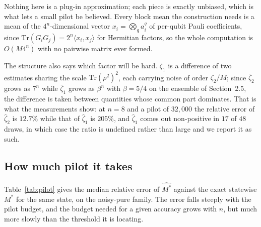 \documentclass[a4paper,superscriptaddress,nofootinbib,onecolumn,nopdfoutputerror]{quantumarticle}
\begin{document}
Nothing here is a plug-in approximation; each piece is exactly unbiased, which is what lets a
small pilot be believed. Every block mean the construction needs is a mean of the
\(4^n\)-dimensional vector \(x_i = \bigotimes_q a_i^q\) of per-qubit Pauli coefficients, since
\(\mathrm{Tr}(G_iG_j) = 2^n \langle x_i, x_j\rangle\) for Hermitian factors, so the whole
computation is \(O(M 4^n)\) with no pairwise matrix ever formed.

The structure also says which factor will be hard. \(\zeta_1\) is a difference of two estimates
sharing the scale \(\mathrm{Tr}(\rho^2)^2\), each carrying noise of order \(\zeta_2/M\); since
\(\bar\zeta_2\) grows as \(7^n\) while \(\bar\zeta_1\) grows as \(\beta^n\) with
\(\beta = 5/4\) on the ensemble of Section~2.5, the
difference is taken between quantities whose common part dominates. That is what the measurements
show: at \(n = 8\) and a pilot of \(32{,}000\) the relative error of \(\hat\zeta_2\) is
\(12.7\%\) while that of \(\hat\zeta_1\) is \(205\%\), and \(\hat\zeta_1\) comes out non-positive
in \(17\) of \(48\) draws, in which case the ratio is undefined rather than large and we report it
as such.

\hypertarget{how-much-pilot-it-takes}{%
\subsection{How much pilot it takes}\label{how-much-pilot-it-takes}}

Table~\ref{tab:pilot} gives the median relative error of \(\widehat{M^*}\) against the exact
statewise \(M^*\) for the same state, on the noisy-pure family. The error falls steeply with the pilot budget, and the budget needed for a given accuracy grows
with \(n\), but much more slowly than the threshold it is locating.
\end{document}
